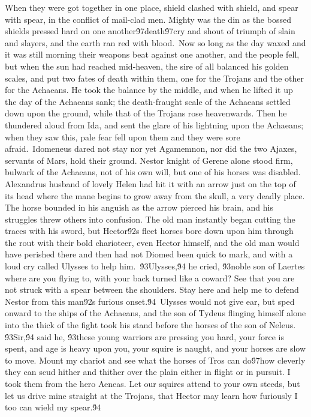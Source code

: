 {When they were got together in one place, shield clashed with shield, and spear with spear, in the conflict of mail-clad men. Mighty was the din as the bossed shields pressed hard on one another\'97death\'97cry and shout of triumph of slain and slayers, and the earth ran red with blood.\
Now so long as the day waxed and it was still morning their weapons beat against one another, and the people fell, but when the sun had reached mid-heaven, the sire of all balanced his golden scales, and put two fates of death within them, one for the Trojans and the other for the Achaeans. He took the balance by the middle, and when he lifted it up the day of the Achaeans sank; the death-fraught scale of the Achaeans settled down upon the ground, while that of the Trojans rose heavenwards. Then he thundered aloud from Ida, and sent the glare of his lightning upon the Achaeans; when they saw this, pale fear fell upon them and they were sore afraid.\
Idomeneus dared not stay nor yet Agamemnon, nor did the two Ajaxes, servants of Mars, hold their ground. Nestor knight of Gerene alone stood firm, bulwark of the Achaeans, not of his own will, but one of his horses was disabled. Alexandrus husband of lovely Helen had hit it with an arrow just on the top of its head where the mane begins to grow away from the skull, a very deadly place. The horse bounded in his anguish as the arrow pierced his brain, and his struggles threw others into confusion. The old man instantly began cutting the traces with his sword, but Hector\'92s fleet horses bore down upon him through the rout with their bold charioteer, even Hector himself, and the old man would have perished there and then had not Diomed been quick to mark, and with a loud cry called Ulysses to help him.\
\'93Ulysses,\'94 he cried, \'93noble son of Laertes where are you flying to, with your back turned like a coward? See that you are not struck with a spear between the shoulders. Stay here and help me to defend Nestor from this man\'92s furious onset.\'94\
Ulysses would not give ear, but sped onward to the ships of the Achaeans, and the son of Tydeus flinging himself alone into the thick of the fight took his stand before the horses of the son of Neleus. \'93Sir,\'94 said he, \'93these young warriors are pressing you hard, your force is spent, and age is heavy upon you, your squire is naught, and your horses are slow to move. Mount my chariot and see what the horses of Tros can do\'97how cleverly they can scud hither and thither over the plain either in flight or in pursuit. I took them from the hero Aeneas. Let our squires attend to your own steeds, but let us drive mine straight at the Trojans, that Hector may learn how furiously I too can wield my spear.\'94\
}

